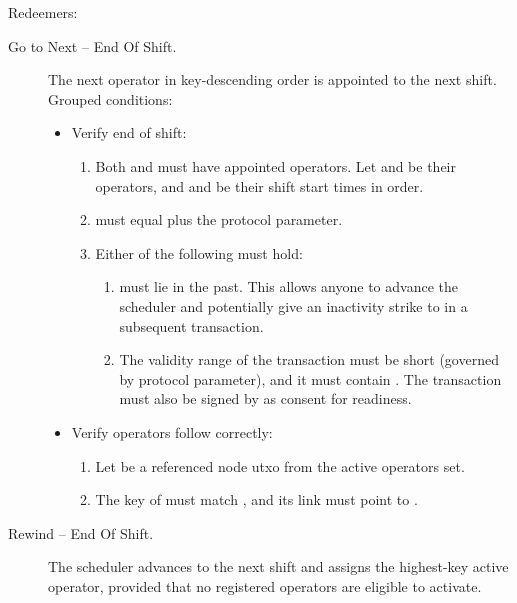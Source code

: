\documentclass[../midgard.tex]{subfiles}
\begin{document}
Redeemers:
\begin{description}
    \item[Go to Next -- End Of Shift.] The next operator in key-descending order is appointed to the next shift.
      Grouped conditions:
      \begin{itemize}
        \item Verify end of shift:
          \begin{enumerate}
            \item Both  and  must have appointed operators.
              Let  and  be their operators, and  and  be their shift start times in order.
            \item {} must equal  plus the  protocol parameter.
            \item Either of the following must hold:
              \begin{enumerate}
                \item {} must lie in the past.
                  This allows anyone to advance the scheduler and potentially give an inactivity strike to  in a subsequent transaction.
                \item The validity range of the transaction must be short (governed by  protocol parameter), and it must contain .
                  The transaction must also be signed by  as consent for readiness.
              \end{enumerate}
          \end{enumerate}
        \item Verify operators follow correctly:
          \begin{enumerate}[resume]
            \item Let  be a referenced node utxo from the active operators set.
            \item The key of  must match , and its link must point to .
          \end{enumerate}
      \end{itemize}
    \item[Rewind -- End Of Shift.] The scheduler advances to the next shift and assigns the highest-key active operator, provided that no registered operators are eligible to activate.

\end{description}
\end{document}
